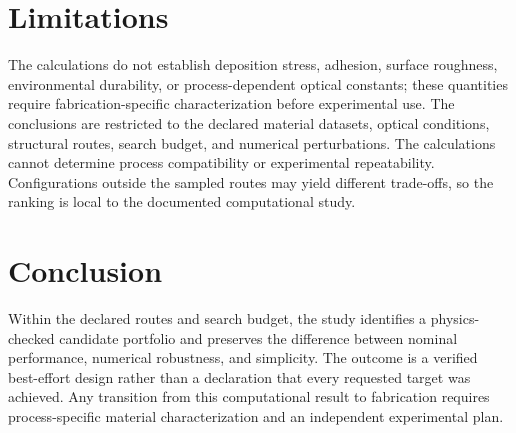 \documentclass[11pt]{article}
\begin{document}
\hypertarget{limitations}{%
\section{Limitations}\label{limitations}}

The calculations do not establish deposition stress, adhesion, surface roughness, environmental durability, or process-dependent optical constants; these quantities require fabrication-specific characterization before experimental use. The conclusions are restricted to the declared material datasets, optical conditions, structural routes, search budget, and numerical perturbations. The calculations cannot determine process compatibility or experimental repeatability. Configurations outside the sampled routes may yield different trade-offs, so the ranking is local to the documented computational study.

\hypertarget{conclusion}{%
\section{Conclusion}\label{conclusion}}

Within the declared routes and search budget, the study identifies a physics-checked candidate portfolio and preserves the difference between nominal performance, numerical robustness, and simplicity. The outcome is a verified best-effort design rather than a declaration that every requested target was achieved. Any transition from this computational result to fabrication requires process-specific material characterization and an independent experimental plan.



\end{document}
